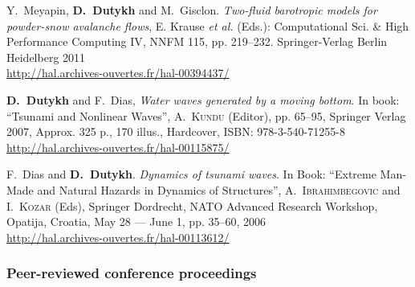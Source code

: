\begin{etaremune}


  \item Y.~Meyapin, \textbf{D.~Dutykh} and M.~Gisclon. \textit{Two-fluid barotropic models for powder-snow avalanche flows}, E. Krause \emph{et al.} (Eds.): Computational Sci. \& High Performance Computing IV, NNFM 115, pp. 219--232. Springer-Verlag Berlin Heidelberg 2011 \\ %
  \url{http://hal.archives-ouvertes.fr/hal-00394437/}
  

  
  \item \textbf{D.~Dutykh} and F.~Dias, \textit{Water waves generated by a moving bottom}. In book: ``Tsunami and Nonlinear Waves'', A.~\textsc{Kundu} (Editor), pp. 65--95, Springer Verlag 2007, Approx. 325 p., 170 illus., Hardcover, ISBN: 978-3-540-71255-8 \\ %
  \url{http://hal.archives-ouvertes.fr/hal-00115875/}
  

  
  \item F.~Dias and \textbf{D.~Dutykh}. \textit{Dynamics of tsunami waves}. In Book: ``Extreme Man-Made and Natural Hazards in Dynamics of Structures'', A.~\textsc{Ibrahimbegovic} and I.~\textsc{Kozar} (Eds), Springer Dordrecht, NATO Advanced Research Workshop, Opatija, Croatia, May 28 --- June 1, pp. 35--60, 2006 \\ %
  \url{http://hal.archives-ouvertes.fr/hal-00113612/}
  
\end{etaremune}

\separator
\subsubsection{Peer-reviewed conference proceedings}

